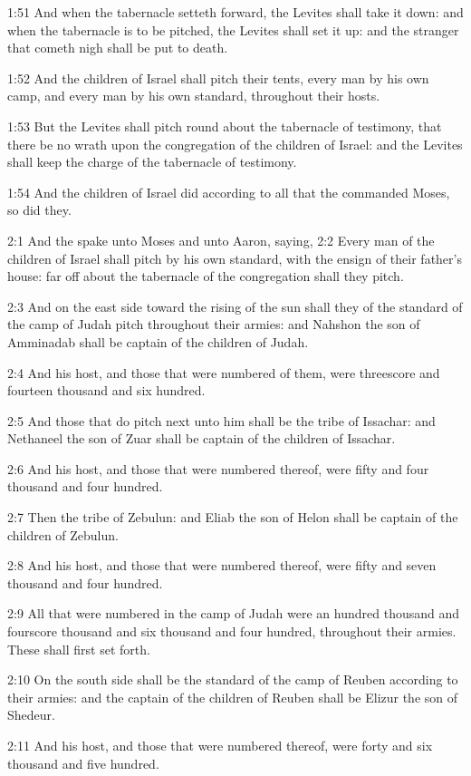 1:51 And when the tabernacle setteth forward, the Levites shall take it down: and when the tabernacle is to be pitched, the Levites shall set it up: and the stranger that cometh nigh shall be put to death.

1:52 And the children of Israel shall pitch their tents, every man by his own camp, and every man by his own standard, throughout their hosts.

1:53 But the Levites shall pitch round about the tabernacle of testimony, that there be no wrath upon the congregation of the children of Israel: and the Levites shall keep the charge of the tabernacle of testimony.

1:54 And the children of Israel did according to all that the \LORD commanded Moses, so did they.

2:1 And the \LORD spake unto Moses and unto Aaron, saying, 2:2 Every man of the children of Israel shall pitch by his own standard, with the ensign of their father's house: far off about the tabernacle of the congregation shall they pitch.

2:3 And on the east side toward the rising of the sun shall they of the standard of the camp of Judah pitch throughout their armies: and Nahshon the son of Amminadab shall be captain of the children of Judah.

2:4 And his host, and those that were numbered of them, were threescore and fourteen thousand and six hundred.

2:5 And those that do pitch next unto him shall be the tribe of Issachar: and Nethaneel the son of Zuar shall be captain of the children of Issachar.

2:6 And his host, and those that were numbered thereof, were fifty and four thousand and four hundred.

2:7 Then the tribe of Zebulun: and Eliab the son of Helon shall be captain of the children of Zebulun.

2:8 And his host, and those that were numbered thereof, were fifty and seven thousand and four hundred.

2:9 All that were numbered in the camp of Judah were an hundred thousand and fourscore thousand and six thousand and four hundred, throughout their armies. These shall first set forth.

2:10 On the south side shall be the standard of the camp of Reuben according to their armies: and the captain of the children of Reuben shall be Elizur the son of Shedeur.

2:11 And his host, and those that were numbered thereof, were forty and six thousand and five hundred.

